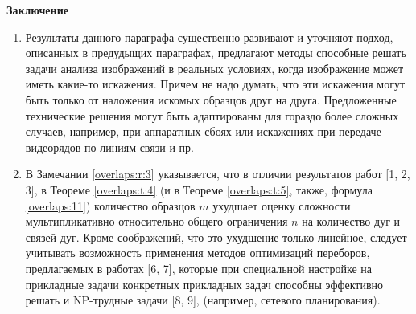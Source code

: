 \noindent
\textbf{Заключение}
\begin{enumerate}
\item Результаты данного параграфа существенно развивают и уточняют подход, описанных в предудыщих параграфах,  предлагают методы способные решать задачи анализа изображений в реальных условиях, когда  изображение может иметь  какие-то искажения. Причем не надо думать, что эти искажения могут быть только от наложения искомых образцов друг на друга. Предложенные технические решения могут быть адаптированы для гораздо более сложных случаев, например, при аппаратных сбоях или искажениях при передаче видеорядов по линиям связи и пр.
\item В Замечании  \ref{overlaps:r:3}  указывается, что в отличии результатов работ  [1, 2, 3], в Теореме \ref{overlaps:t:4} (и в Теореме \ref{overlaps:t:5}, также, формула \ref{overlaps:11}) количество образцов  $m$  ухудшает оценку сложности мультипликативно относительно общего ограничения  $n$  на количество дуг и связей дуг. Кроме соображений, что это ухудшение только линейное, следует учитывать возможность применения методов оптимизаций переборов, предлагаемых в работах [6, 7], которые при специальной настройке на прикладные задачи конкретных прикладных задач способны эффективно решать и  NP-трудные задачи [8, 9],  (например, сетевого планирования). 
\end{enumerate}
 
